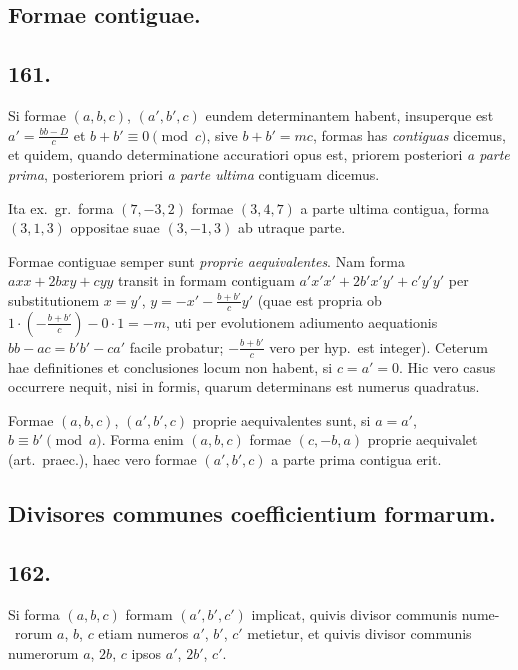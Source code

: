 \documentclass[12pt,a4paper]{article}
\theoremstyle{plain}
\theoremstyle{definition}
\theoremstyle{remark}
\begin{document}
\subsection*{Formae contiguae.}

\subsection*{161.}

Si formae $(a,b,c)$, $(a',b',c)$ eundem determinantem habent, insuperque est
$a' = \frac{bb - D}{c}$ et $b + b' \equiv 0 \pmod{c}$, sive $b + b' = mc$, formas has \emph{contiguas} dicemus,
et quidem, quando determinatione accuratiori opus est, priorem posteriori \emph{a parte
prima}, posteriorem priori \emph{a parte ultima} contiguam dicemus.

Ita ex.\ gr.\ forma $(7, -3, 2)$ formae $(3, 4, 7)$ a parte ultima contigua, forma
$(3, 1, 3)$ oppositae suae $(3, -1, 3)$ ab utraque parte.

Formae contiguae semper sunt \emph{proprie aequivalentes}. Nam forma $axx + 2bxy +
cyy$ transit in formam contiguam $a'x'x' + 2b'x'y' + c'y'y'$ per substitutionem
$x = y'$, $y = -x' - \frac{b+b'}{c}y'$ (quae est propria ob $1 \cdot (-\frac{b+b'}{c}) - 0 \cdot 1 = -m$, uti per
evolutionem adiumento aequationis $bb - ac = b'b' - ca'$ facile probatur; $-\frac{b+b'}{c}$
vero per hyp.\ est integer). Ceterum hae definitiones et conclusiones locum non
habent, si $c = a' = 0$. Hic vero casus occurrere nequit, nisi in formis, quarum
determinans est numerus quadratus.

Formae $(a,b,c)$, $(a',b',c)$ proprie aequivalentes sunt, si $a = a'$, $b \equiv b' \pmod{a}$.
Forma enim $(a,b,c)$ formae $(c, -b, a)$ proprie aequivalet (art.\ praec.), haec vero
formae $(a', b', c)$ a parte prima contigua erit.

\subsection*{Divisores communes coefficientium formarum.}

\subsection*{162.}

Si forma $(a,b,c)$ formam $(a',b',c')$ implicat, quivis divisor communis nume-\ rorum $a$, $b$, $c$ etiam numeros $a'$, $b'$, $c'$ metietur, et quivis divisor communis numerorum
$a$, $2b$, $c$ ipsos $a'$, $2b'$, $c'$.
\end{document}
